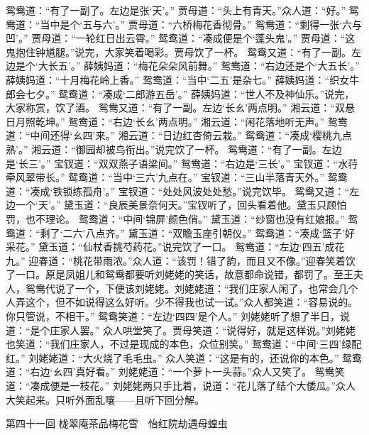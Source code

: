\documentclass[12pt,oneside]{book}
\begin{document}
鸳鸯道：“有了一副了。左边是张‘天’。”
贾母道：“头上有青天。”众人道：“好。”
鸳鸯道：“当中是个‘五与六’。”
贾母道：“六桥梅花香彻骨。”
鸳鸯道：“剩得一张‘六与凹’。”
贾母道：“一轮红日出云霄。”
鸳鸯道：“凑成便是个‘蓬头鬼’。”
贾母道：“这鬼抱住钟馗腿。”说完，大家笑着喝彩。贾母饮了一杯。
鸳鸯又道：“有了一副。左边是个‘大长五’。”
薛姨妈道：“梅花朵朵风前舞。”
鸳鸯道：“右边还是个‘大五长’。”
薛姨妈道：“十月梅花岭上香。”
鸳鸯道：“当中‘二五’是杂七。”
薛姨妈道：“织女牛郎会七夕。”
鸳鸯道：“凑成‘二郎游五岳’。”
薛姨妈道：“世人不及神仙乐。”说完，大家称赏，饮了酒。
鸳鸯又道：“有了一副。左边‘长ㄠ’两点明。”
湘云道：“双悬日月照乾坤。”
鸳鸯道：“右边‘长ㄠ’两点明。”
湘云道：“闲花落地听无声。”
鸳鸯道：“中间还得‘ㄠ四’来。”
湘云道：“日边红杏倚云栽。”
鸳鸯道：“凑成‘樱桃九点熟’。”
湘云道：“御园却被鸟衔出。”说完饮了一杯。
鸳鸯道：“有了一副。左边是‘长三’。”
宝钗道：“双双燕子语梁间。”
鸳鸯道：“右边是‘三长’。”
宝钗道：“水荇牵风翠带长。”
鸳鸯道：“当中‘三六’九点在。”
宝钗道：“三山半落青天外。”
鸳鸯道：“凑成‘铁锁练孤舟’。”
宝钗道：“处处风波处处愁。”说完饮毕。
鸳鸯又道：“左边一个‘天’。”
黛玉道：“良辰美景奈何天。”宝钗听了，回头看着他。黛玉只顾怕罚，也不理论。
鸳鸯道：“中间‘锦屏’颜色俏。”
黛玉道：“纱窗也没有红娘报。”
鸳鸯道：“剩了‘二六’八点齐。”
黛玉道：“双瞻玉座引朝仪。”
鸳鸯道：“凑成‘篮子’好采花。”
黛玉道：“仙杖香挑芍药花。”说完饮了一口。
鸳鸯道：“左边‘四五’成花九。”
迎春道：“桃花带雨浓。”众人道：“该罚！错了韵，而且又不像。”迎春笑着饮了一口。原是凤姐儿和鸳鸯都要听刘姥姥的笑话，故意都命说错，都罚了。至王夫人，鸳鸯代说了一个，下便该刘姥姥。刘姥姥道：“我们庄家人闲了，也常会几个人弄这个，但不如说得这么好听。少不得我也试一试。”众人都笑道：“容易说的。你只管说，不相干。”
鸳鸯笑道：“左边‘四四’是个人。”
刘姥姥听了想了半日，说道：“是个庄家人罢。”
众人哄堂笑了。贾母笑道：“说得好，就是这样说。”刘姥姥也笑道：“我们庄家人，不过是现成的本色，众位别笑。”
鸳鸯道：“中间‘三四’绿配红。”
刘姥姥道：“大火烧了毛毛虫。”
众人笑道：“这是有的，还说你的本色。”
鸳鸯道：“右边‘ㄠ四’真好看。”
刘姥姥道：“一个萝卜一头蒜。”众人又笑了。
鸳鸯笑道：“凑成便是一枝花。”
刘姥姥两只手比着，说道：“花儿落了结个大倭瓜。”众人大笑起来。只听外面乱嚷——且听下回分解。

 
第四十一回  栊翠庵茶品梅花雪　怡红院劫遇母蝗虫
\end{document}
